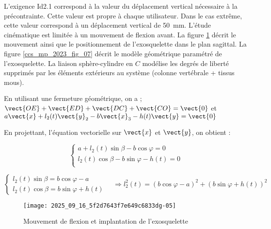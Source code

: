 L'exigence Id2.1 correspond à la valeur du déplacement vertical nécessaire à la précontrainte. Cette valeur est propre à chaque utilisateur. Dans le cas extrême, cette valeur correspond à un déplacement vertical de \SI{50}{mm}. L'étude cinématique est limitée à un mouvement de flexion avant. La figure \ref{ccs_mp_2023_fig_06} décrit le mouvement ainsi que le positionnement de l'exosquelette dans le plan sagittal. La figure \ref{ccs_mp_2023_fig_07} décrit le modèle géométrique paramétré de l'exosquelette. La liaison sphère-cylindre en $C$ modélise les degrés de liberté supprimés par les éléments extérieurs au système (colonne vertébrale + tissus mous).\\

\ifprof
\begin{corrige}
En utilisant une fermeture géométrique, on a ; 
$ \vect{OE} + \vect{ED} + \vect{DC} + \vect{CO} = \vect{0} $ et 
$a \vect{x} + l_2(t) \vect{y}_2 - b\vect{x}_3 - h(t) \vect{y} = \vect{0} $

En projettant, l'équation vectorielle sur $\vect{x}$ et $\vect{y}$, on obtient :

$$
\left\{
\begin{array}{l}
a  + l_2(t) \sin\beta - b\cos\varphi = 0  \\
 l_2(t) \cos\beta - b\sin\varphi - h(t)  = 0  \\
\end{array}
\right.
$$


$$
\left\{
\begin{array}{l}
l_2(t) \sin\beta  = b\cos\varphi -a   \\
 l_2(t) \cos\beta =   b\sin\varphi + h(t) 
\end{array}
\right.
\quad
\Rightarrow
l_2^2(t) = \left(b\cos\varphi -a  \right)^2  + \left(b\sin\varphi + h(t) \right)^2 
$$

\end{corrige}
\else
\fi




\begin{figure}[!h]
\centering
\texttt{[image: 2025\_09\_16\_5f2d7643f7e649c6833dg-05]}
\caption{\label{ccs_mp_2023_fig_06}  Mouvement de flexion et implantation de l'exosquelette}
\end{figure}



